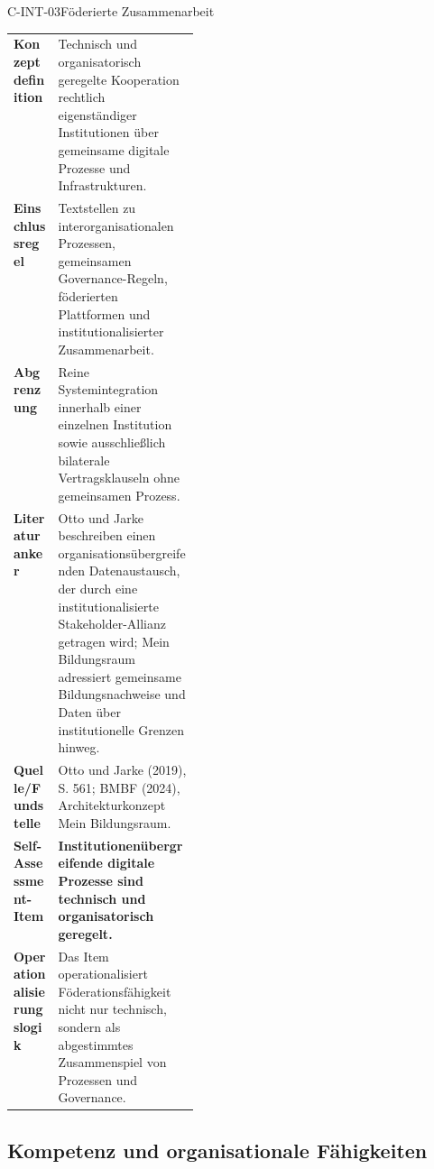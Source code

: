 \documentclass[10pt,a4paper]{article}
\begin{document}
\begin{codecard}{C-INT-03}{Föderierte Zusammenarbeit}
\begin{tabularx}{\linewidth}{@{}>{\RaggedRight\arraybackslash\bfseries\color{DeepNavy}}p{0.245\linewidth}>{\RaggedRight\arraybackslash}X@{}}
Konzeptdefinition & Technisch und organisatorisch geregelte Kooperation rechtlich eigenständiger Institutionen über gemeinsame digitale Prozesse und Infrastrukturen. \\
\arrayrulecolor{SoftRule}\hline
Einschlussregel & Textstellen zu interorganisationalen Prozessen, gemeinsamen Governance-Regeln, föderierten Plattformen und institutionalisierter Zusammenarbeit. \\
\arrayrulecolor{SoftRule}\hline
Abgrenzung & Reine Systemintegration innerhalb einer einzelnen Institution sowie ausschließlich bilaterale Vertragsklauseln ohne gemeinsamen Prozess. \\
\arrayrulecolor{SoftRule}\hline
Literaturanker & Otto und Jarke beschreiben einen organisationsübergreifenden Datenaustausch, der durch eine institutionalisierte Stakeholder-Allianz getragen wird; Mein Bildungsraum adressiert gemeinsame Bildungsnachweise und Daten über institutionelle Grenzen hinweg. \\
\arrayrulecolor{SoftRule}\hline
Quelle/Fundstelle & Otto und Jarke (2019), S. 561; BMBF (2024), Architekturkonzept Mein Bildungsraum. \\
\arrayrulecolor{SoftRule}\hline
Self-Assessment-Item & \textbf{Institutionenübergreifende digitale Prozesse sind technisch und organisatorisch geregelt.} \\
\arrayrulecolor{SoftRule}\hline
Operationalisierungslogik & Das Item operationalisiert Föderationsfähigkeit nicht nur technisch, sondern als abgestimmtes Zusammenspiel von Prozessen und Governance. \\
\end{tabularx}
\end{codecard}

\subsection{Kompetenz und organisationale Fähigkeiten}
\label{supp:dimension-5}
\end{document}
